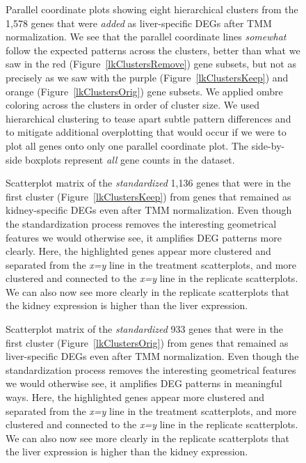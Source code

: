 \documentclass{bmcart}
\begin{document}
\begin{linenumbers}
\begin{backmatter}
\begin{figure}[h!]
\caption{
Parallel coordinate plots showing eight hierarchical clusters from the 1,578 genes that were \textit{added} as liver-specific DEGs after TMM normalization. We see that the parallel coordinate lines \textit{somewhat} follow the expected patterns across the clusters, better than what we saw in the red (Figure~\ref{lkClustersRemove}) gene subsets, but not as precisely as we saw with the purple (Figure~\ref{lkClustersKeep}) and orange (Figure~\ref{lkClustersOrig}) gene subsets. We applied ombre coloring across the clusters in order of cluster size. We used hierarchical clustering to tease apart subtle pattern differences and to mitigate additional overplotting that would occur if we were to plot all genes onto only one parallel coordinate plot. The side-by-side boxplots represent \textit{all} gene counts in the dataset.
\label{lkClustersAdd}}
\end{figure}

\begin{figure}[h!]
\caption{
Scatterplot matrix of the \textit{standardized} 1,136 genes that were in the first cluster (Figure~\ref{lkClustersKeep}) from genes that remained as kidney-specific DEGs even after TMM normalization. Even though the standardization process removes the interesting geometrical features we would otherwise see, it amplifies DEG patterns more clearly. Here, the highlighted genes appear more clustered and separated from the \textit{x=y} line in the treatment scatterplots, and more clustered and connected to the \textit{x=y} line in the replicate scatterplots. We can also now see more clearly in the replicate scatterplots that the kidney expression is higher than the liver expression.
\label{lkClustersKeepSM-St}}
\end{figure}

\begin{figure}[h!]
\caption{
Scatterplot matrix of the \textit{standardized} 933 genes that were in the first cluster (Figure~\ref{lkClustersOrig}) from genes that remained as liver-specific DEGs even after TMM normalization. Even though the standardization process removes the interesting geometrical features we would otherwise see, it amplifies DEG patterns in meaningful ways. Here, the highlighted genes appear more clustered and separated from the \textit{x=y} line in the treatment scatterplots, and more clustered and connected to the \textit{x=y} line in the replicate scatterplots. We can also now see more clearly in the replicate scatterplots that the liver expression is higher than the kidney expression. 
\label{lkClustersOrigSM-St}}
\end{figure}


\end{backmatter}
\end{linenumbers}
\end{document}
